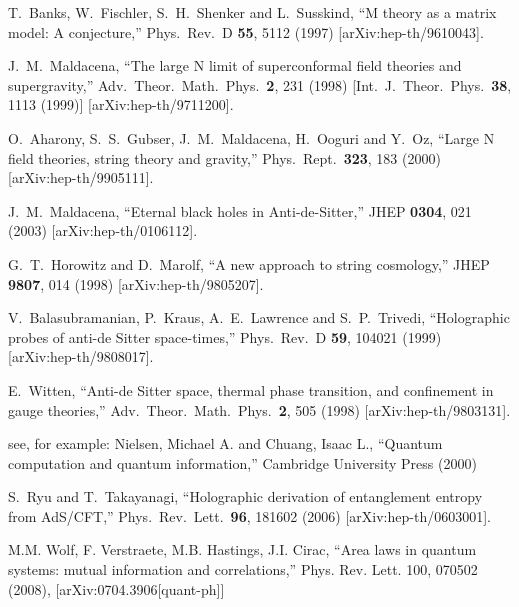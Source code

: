 \documentclass[12pt,epsf]{article}
\renewcommand{\(}{\left(}
\renewcommand{\)}{\right)}
\begin{document}
\begin{thebibliography}{999}

  T.~Banks, W.~Fischler, S.~H.~Shenker and L.~Susskind,
  ``M theory as a matrix model: A conjecture,''
  Phys.\ Rev.\  D {\bf 55}, 5112 (1997)
  [arXiv:hep-th/9610043].


  J.~M.~Maldacena,
  ``The large N limit of superconformal field theories and supergravity,''
  Adv.\ Theor.\ Math.\ Phys.\  {\bf 2}, 231 (1998)
  [Int.\ J.\ Theor.\ Phys.\  {\bf 38}, 1113 (1999)]
  [arXiv:hep-th/9711200].

  O.~Aharony, S.~S.~Gubser, J.~M.~Maldacena, H.~Ooguri and Y.~Oz,
  ``Large N field theories, string theory and gravity,''
  Phys.\ Rept.\  {\bf 323}, 183 (2000)
  [arXiv:hep-th/9905111].

  J.~M.~Maldacena,
  ``Eternal black holes in Anti-de-Sitter,''
  JHEP {\bf 0304}, 021 (2003)
  [arXiv:hep-th/0106112].

  G.~T.~Horowitz and D.~Marolf,
  ``A new approach to string cosmology,''
  JHEP {\bf 9807}, 014 (1998)
  [arXiv:hep-th/9805207].

  V.~Balasubramanian, P.~Kraus, A.~E.~Lawrence and S.~P.~Trivedi,
  ``Holographic probes of anti-de Sitter space-times,''
  Phys.\ Rev.\  D {\bf 59}, 104021 (1999)
  [arXiv:hep-th/9808017].

  E.~Witten,
   ``Anti-de Sitter space, thermal phase transition, and confinement in  gauge
  theories,''
  Adv.\ Theor.\ Math.\ Phys.\  {\bf 2}, 505 (1998)
  [arXiv:hep-th/9803131].


see, for example:
Nielsen, Michael A. and Chuang, Isaac L.,
``Quantum computation and quantum information,''
Cambridge University Press (2000)

  S.~Ryu and T.~Takayanagi,
  ``Holographic derivation of entanglement entropy from AdS/CFT,''
  Phys.\ Rev.\ Lett.\  {\bf 96}, 181602 (2006)
  [arXiv:hep-th/0603001].

M.M. Wolf, F. Verstraete, M.B. Hastings, J.I. Cirac,
``Area laws in quantum systems: mutual information and correlations,''
Phys. Rev. Lett. 100, 070502 (2008), [arXiv:0704.3906[quant-ph]]



\end{thebibliography}
\end{document}
